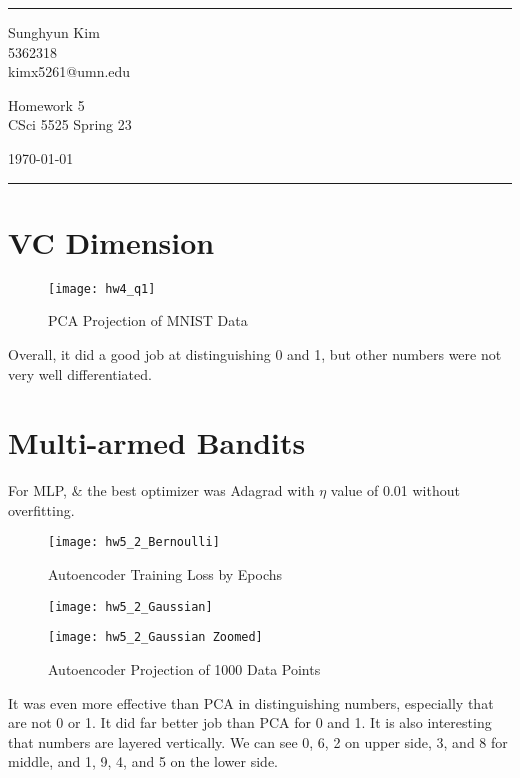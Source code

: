 \documentclass[a4paper]{article}
\begin{document}

\fancyhead[C]{}
\hrule \medskip %
\begin{minipage}{0.295\textwidth} 
\raggedright
\footnotesize
Sunghyun Kim \hfill\\   
5362318\hfill\\
kimx5261@umn.edu
\end{minipage}
\begin{minipage}{0.4\textwidth} 
\centering 
\large 
Homework 5\\ 
\normalsize 
CSci 5525 Spring 23 \\ 
\end{minipage}
\begin{minipage}{0.295\textwidth} 
\raggedleft
\today\hfill\\
\end{minipage}
\medskip\hrule 
\bigskip


\section{VC Dimension}
\graphicspath{{/media/kimsh96453/SANDISK 128/23 Spring/CSCI5525/Homeworks/HW5/hw5_code_templates}}

\begin{figure}[!h]
	\centering
		\texttt{[image: hw4\_q1]}
	\caption{PCA Projection of MNIST Data}
\end{figure}

Overall, it did a good job at distinguishing 0 and 1, but other numbers were not very well differentiated. 


\bigskip


\newpage
\section{Multi-armed Bandits}
For MLP, \& the best optimizer was Adagrad with $\eta$ value of 0.01 without overfitting. 

\graphicspath{{/media/kimsh96453/SANDISK 128/23 Spring/CSCI5525/Homeworks/HW5/hw5_code_templates}}
\begin{figure}[h!]
	\centering
	\texttt{[image: hw5\_2\_Bernoulli]}
	\caption{Autoencoder Training Loss by Epochs}
	\texttt{[image: hw5\_2\_Gaussian]}
	\caption{Autoencoder Projection of 1000 Data Points}
	\texttt{[image: hw5\_2\_Gaussian Zoomed]}
\end{figure}

It was even more effective than PCA in distinguishing numbers, especially that are not 0 or 1. It did far better job than PCA for 0 and 1. It is also interesting that numbers are layered vertically. We can see 0, 6, 2 on upper side, 3, and 8 for middle, and 1, 9, 4, and 5 on the lower side. 

\bigskip



\end{document}
